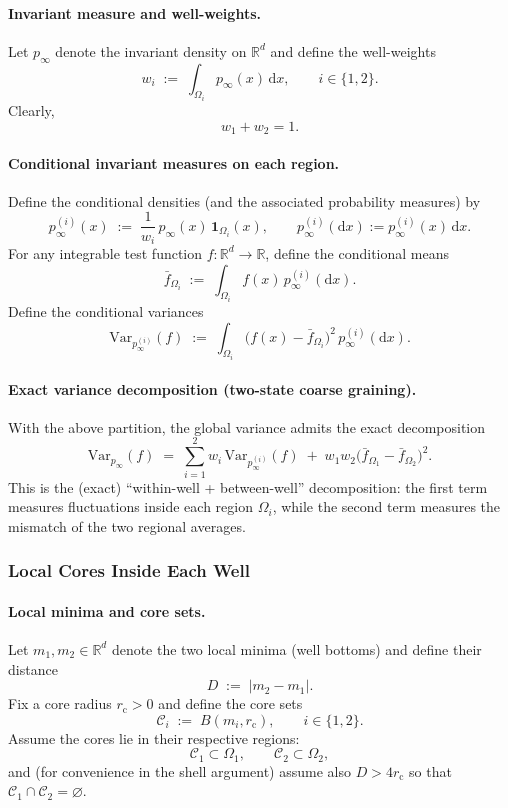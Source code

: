 \paragraph{Invariant measure and well-weights.}
Let $p_\infty$ denote the invariant density on $\mathbb R^d$ and define the well-weights
\[
w_i \;:=\; \int_{\Omega_i} p_\infty(x)\,\mathrm dx,
\qquad i\in\{1,2\}.
\]
Clearly,
\[
w_1+w_2=1.
\]

\paragraph{Conditional invariant measures on each region.}
Define the conditional densities (and the associated probability measures) by
\[
p_\infty^{(i)}(x)
\;:=\;
\frac{1}{w_i}\,p_\infty(x)\,\mathbf 1_{\Omega_i}(x),
\qquad
p_\infty^{(i)}(\mathrm dx) := p_\infty^{(i)}(x)\,\mathrm dx.
\]
For any integrable test function $f:\mathbb R^d\to\mathbb R$, define the conditional means
\[
\bar f_{\Omega_i}
\;:=\;
\int_{\Omega_i} f(x)\,p_\infty^{(i)}(\mathrm dx).
\]
Define the conditional variances
\[
\mathrm{Var}_{p_\infty^{(i)}}(f)
\;:=\;
\int_{\Omega_i}\bigl(f(x)-\bar f_{\Omega_i}\bigr)^2\,p_\infty^{(i)}(\mathrm dx).
\]

\paragraph{Exact variance decomposition (two-state coarse graining).}
With the above partition, the global variance admits the exact decomposition
\begin{equation}\label{eq:var-decomp-Omega}
\mathrm{Var}_{p_\infty}(f)
\;=\;
\sum_{i=1}^2 w_i\,\mathrm{Var}_{p_\infty^{(i)}}(f)
\;+\;
w_1w_2\bigl(\bar f_{\Omega_1}-\bar f_{\Omega_2}\bigr)^2.
\end{equation}
This is the (exact) ``within-well + between-well'' decomposition:
the first term measures fluctuations inside each region $\Omega_i$,
while the second term measures the mismatch of the two regional averages.
\subsubsection{Local Cores Inside Each Well}\label{sec:cores}

\paragraph{Local minima and core sets.}
Let $m_1,m_2\in\mathbb R^d$ denote the two local minima (well bottoms) and define their distance
\[
D \;:=\; |m_2-m_1|.
\]
Fix a core radius $r_{\mathrm c}>0$ and define the core sets
\[
\mathcal C_i \;:=\; B(m_i,r_{\mathrm c}),
\qquad i\in\{1,2\}.
\]
Assume the cores lie in their respective regions:
\[
\mathcal C_1\subset \Omega_1,
\qquad
\mathcal C_2\subset \Omega_2,
\]
and (for convenience in the shell argument) assume also $D>4r_{\mathrm c}$ so that $\mathcal C_1\cap\mathcal C_2=\varnothing$.

